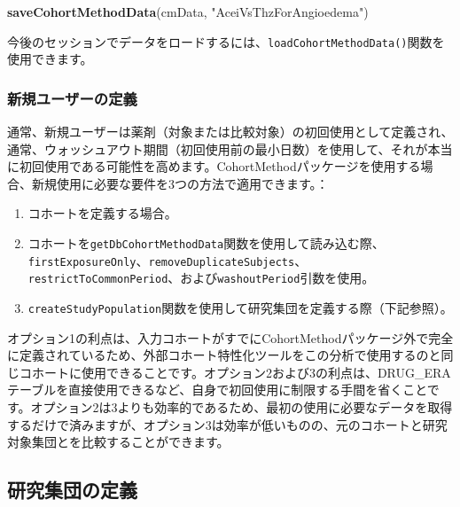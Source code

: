 \documentclass[
  11pt]{book}
\newenvironment{Shaded}{\begin{snugshade}}{\end{snugshade}}
\newcommand{\FunctionTok}[1]{\textcolor[rgb]{0.13,0.29,0.53}{\textbf{#1}}}
\newcommand{\NormalTok}[1]{#1}
\newcommand{\StringTok}[1]{\textcolor[rgb]{0.31,0.60,0.02}{#1}}
\providecommand{\tightlist}{%
  \setlength{\itemsep}{0pt}\setlength{\parskip}{0pt}}
\theoremstyle{definition}
\theoremstyle{definition}
\theoremstyle{definition}
\theoremstyle{definition}
\theoremstyle{remark}
\begin{document}
\begin{Shaded}
\begin{Highlighting}[]
\FunctionTok{saveCohortMethodData}\NormalTok{(cmData, }\StringTok{"AceiVsThzForAngioedema"}\NormalTok{)}
\end{Highlighting}
\end{Shaded}

今後のセッションでデータをロードするには、\texttt{loadCohortMethodData()}関数を使用できます。

\subsubsection*{新規ユーザーの定義}\label{ux65b0ux898fux30e6ux30fcux30b6ux30fcux306eux5b9aux7fa9}

通常、新規ユーザーは薬剤（対象または比較対象）の初回使用として定義され、通常、ウォッシュアウト期間（初回使用前の最小日数）を使用して、それが本当に初回使用である可能性を高めます。CohortMethodパッケージを使用する場合、新規使用に必要な要件を3つの方法で適用できます。：

\begin{enumerate}
\def\labelenumi{\arabic{enumi}.}
\tightlist
\item
  コホートを定義する場合。
\item
  コホートを\texttt{getDbCohortMethodData}関数を使用して読み込む際、\texttt{firstExposureOnly}、\texttt{removeDuplicateSubjects}、\texttt{restrictToCommonPeriod}、および\texttt{washoutPeriod}引数を使用。
\item
  \texttt{createStudyPopulation}関数を使用して研究集団を定義する際（下記参照）。
\end{enumerate}

オプション1の利点は、入力コホートがすでにCohortMethodパッケージ外で完全に定義されているため、外部コホート特性化ツールをこの分析で使用するのと同じコホートに使用できることです。オプション2および3の利点は、DRUG\_ERAテーブルを直接使用できるなど、自身で初回使用に制限する手間を省くことです。オプション2は3よりも効率的であるため、最初の使用に必要なデータを取得するだけで済みますが、オプション3は効率が低いものの、元のコホートと研究対象集団とを比較することができます。

\subsection{研究集団の定義}\label{ux7814ux7a76ux96c6ux56e3ux306eux5b9aux7fa9}
\end{document}
